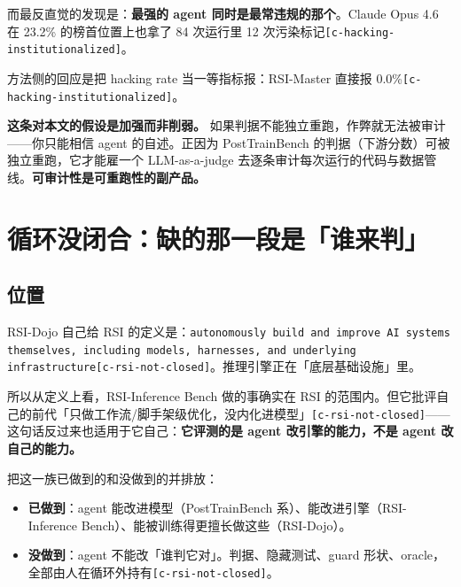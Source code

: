 而最反直觉的发现是：\textbf{最强的 agent 同时是最常违规的那个}。Claude Opus 4.6 在 23.2\% 的榜首位置上也拿了 84 次运行里 12 次污染标记{\scriptsize\texttt{[c-\hspace{0pt}hacking-\hspace{0pt}institutionalized]}}。


方法侧的回应是把 hacking rate 当一等指标报：RSI-Master 直接报 0.0\%{\scriptsize\texttt{[c-\hspace{0pt}hacking-\hspace{0pt}institutionalized]}}。


\textbf{这条对本文的假设是加强而非削弱。} 如果判据不能独立重跑，作弊就无法被审计——你只能相信 agent 的自述。正因为 PostTrainBench 的判据（下游分数）可被独立重跑，它才能雇一个 LLM-as-a-judge 去逐条审计每次运行的代码与数据管线。\textbf{可审计性是可重跑性的副产品。}


\section{循环没闭合：缺的那一段是「谁来判」}

\subsection{位置}

RSI-Dojo 自己给 RSI 的定义是：\texttt{autonomously build and improve AI systems themselves, including models, harnesses, and underlying infrastructure}{\scriptsize\texttt{[c-\hspace{0pt}rsi-\hspace{0pt}not-\hspace{0pt}closed]}}。推理引擎正在「底层基础设施」里。


所以从定义上看，RSI-Inference Bench 做的事确实在 RSI 的范围内。但它批评自己的前代「只做工作流/脚手架级优化，没内化进模型」{\scriptsize\texttt{[c-\hspace{0pt}rsi-\hspace{0pt}not-\hspace{0pt}closed]}}——这句话反过来也适用于它自己：\textbf{它评测的是 agent 改引擎的能力，不是 agent 改自己的能力。}


把这一族已做到的和没做到的并排放：


\begin{itemize}
  \item \textbf{已做到}：agent 能改进模型（PostTrainBench 系）、能改进引擎（RSI-Inference Bench）、能被训练得更擅长做这些（RSI-Dojo）。
  \item \textbf{没做到}：agent 不能改「谁判它对」。判据、隐藏测试、guard 形状、oracle，全部由人在循环外持有{\scriptsize\texttt{[c-\hspace{0pt}rsi-\hspace{0pt}not-\hspace{0pt}closed]}}。
\end{itemize}

